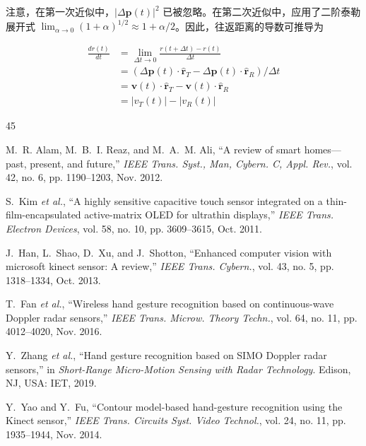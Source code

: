 \begin{TranslationNoMiniToc}
注意，在第一次近似中，$|\Delta \boldsymbol{p}(t)|^2$ 已被忽略。在第二次近似中，应用了二阶泰勒展开式 $\lim_{\alpha \to 0} (1 + \alpha)^{1/2} \approx 1 + \alpha/2$。因此，往返距离的导数可推导为

\begin{equation}
\begin{aligned}
\frac{dr(t)}{dt} &= \lim_{\Delta t \to 0} \frac{r(t + \Delta t) - r(t)}{\Delta t} \\
&= (\Delta \boldsymbol{p}(t) \cdot \boldsymbol{\hat{r}}_T - \Delta \boldsymbol{p}(t) \cdot \boldsymbol{\hat{r}}_R) / \Delta t \\
&= \boldsymbol{v}(t) \cdot \boldsymbol{\hat{r}}_T - \boldsymbol{v}(t) \cdot \boldsymbol{\hat{r}}_R \\
&= |v_T(t)| - |v_R(t)|
\end{aligned}
\end{equation}

\begingroup
\singlespacing
\fontsize{10.5pt}{10.5pt}\selectfont
\setlength{\bibsep}{0pt}  %
\renewcommand{\refname}{参考文献}
\begin{thebibliography}{45}

M.~R. Alam, M.~B.~I. Reaz, and M.~A.~M. Ali, ``A review of smart homes—past, present, and future,'' \emph{IEEE Trans. Syst., Man, Cybern. C, Appl. Rev.}, vol. 42, no. 6, pp. 1190--1203, Nov. 2012.

S.~Kim \emph{et al.}, ``A highly sensitive capacitive touch sensor integrated on a thin-film-encapsulated active-matrix OLED for ultrathin displays,'' \emph{IEEE Trans. Electron Devices}, vol. 58, no. 10, pp. 3609--3615, Oct. 2011.

J.~Han, L.~Shao, D.~Xu, and J.~Shotton, ``Enhanced computer vision with microsoft kinect sensor: A review,'' \emph{IEEE Trans. Cybern.}, vol. 43, no. 5, pp. 1318--1334, Oct. 2013.

T.~Fan \emph{et al.}, ``Wireless hand gesture recognition based on continuous-wave Doppler radar sensors,'' \emph{IEEE Trans. Microw. Theory Techn.}, vol. 64, no. 11, pp. 4012--4020, Nov. 2016.

Y.~Zhang \emph{et al.}, ``Hand gesture recognition based on SIMO Doppler radar sensors,'' in \emph{Short-Range Micro-Motion Sensing with Radar Technology}. Edison, NJ, USA: IET, 2019.

Y.~Yao and Y.~Fu, ``Contour model-based hand-gesture recognition using the Kinect sensor,'' \emph{IEEE Trans. Circuits Syst. Video Technol.}, vol. 24, no. 11, pp. 1935--1944, Nov. 2014.


\end{thebibliography}
\end{TranslationNoMiniToc}
